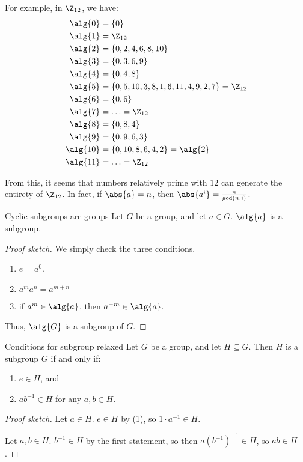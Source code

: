 For example, in $\Z_{12}$, we have:
\begin{align*}
    \alg{0} &= \{0\} \\
    \alg{1} &= \Z_{12} \\
    \alg{2} &= \{0, 2, 4, 6, 8, 10\} \\
    \alg{3} &= \{0, 3, 6, 9\} \\
    \alg{4} &= \{0, 4, 8\} \\
    \alg{5} &= \{0, 5, 10, 3, 8, 1, 6, 11, 4, 9, 2, 7\} = \Z_{12} \\
    \alg{6} &= \{0, 6\} \\
    \alg{7} &= \ldots = \Z_{12} \\
    \alg{8} &= \{ 0, 8, 4 \} \\
    \alg{9} &= \{0, 9, 6, 3\} \\
    \alg{10} &= \{0, 10, 8, 6, 4, 2\} = \alg{2} \\
    \alg{11} &= \ldots = \Z_{12}
\end{align*}

From this, it seems that numbers relatively prime with $12$ can generate the entirety of $\Z_{12}$. In fact, if $\abs{a} = n$, then $\abs{a^i} = \frac{n}{\gcd(n, i)}$. 

\begin{thmbox}{Cyclic subgroups are groups}{}
    Let $G$ be a group, and let $a \in G$. $\alg{a}$ is a subgroup.
    \tcblower
    \begin{proof}[Proof sketch]
        We simply check the three conditions.
        \begin{enumerate}
            \item $e = a^0$.
            \item $a^m a^n = a^{m+n}$
            \item if $a^m \in \alg{a}$, then $a^{-m} \in \alg{a}$.
        \end{enumerate}
        Thus, $\alg{G}$ is a subgroup of $G$.
    \end{proof}
\end{thmbox}

\begin{thmbox}{Conditions for subgroup relaxed}{}
    Let $G$ be a group, and let $H \subseteq G$. Then $H$ is a subgroup $G$ if and only if:
    \begin{enumerate}
        \item $e \in H$, and
        \item $ab^{-1} \in H$ for any $a,b \in H$.
    \end{enumerate}
    \tcblower
    \begin{proof}[Proof sketch]
        Let $a \in H$. $e \in H$ by (1), so $1 \cdot a^{-1} \in H$.

        Let $a,b \in H$. $b^{-1} \in H$ by the first statement, so then $a(b^{-1})^{-1} \in H$, so $ab \in H$.
    \end{proof}
\end{thmbox}

